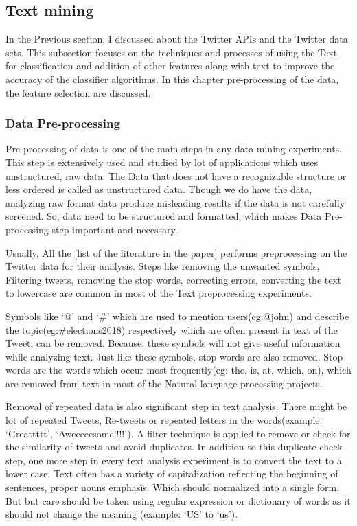  
\subsection{Text mining}

In the Previous section, I discussed about the Twitter APIs and the Twitter data sets. This subsection focuses on the techniques and processes of using the Text for classification and addition of other features along with text to improve the accuracy of the classifier algorithms.  In this chapter pre-processing of the data, the feature selection are discussed.

\subsubsection{Data Pre-processing}

Pre-processing of data is one of the main steps in any data mining experiments. This step is extensively used and studied by lot of applications which uses unstructured, raw data. The Data that does not have a recognizable structure or less ordered is called as unstructured data.  Though we do have the data, analyzing raw format data produce misleading results if the data is not carefully screened. So, data need to be structured and formatted, which makes Data Pre-processing step important and necessary.

Usually, All the \underline{[list of the literature in the paper]} performs preprocessing on the Twitter data for their analysis. Steps like removing the unwanted symbols, Filtering tweets, removing the stop words,  correcting errors, converting the text to lowercase are common in most of the Text preprocessing experiments.

Symbols like `@' and `\#' which are used to mention users(eg:@john) and describe the topic(eg:\#elections2018) respectively which are often present in text of the Tweet, can be removed. Because, these symbols will not give useful information while analyzing text. Just like these symbols, stop words are also removed. Stop words are the words which occur most frequently(eg: the, is, at, which, on), which are removed from text in most of the Natural language processing projects. 

Removal of repeated data is also significant step in text analysis. There might be lot of repeated Tweets, Re-tweets or repeated letters in the words(example: `Greattttt', `Aweeeeesome!!!!'). A filter technique is applied to remove or check for the similarity of tweets and avoid duplicates. In addition to this duplicate check step, one more step in every text analysis experiment is to convert the text to a lower case. Text often has a variety of capitalization reflecting the beginning of sentences, proper nouns emphasis. Which should normalized into a single form. But but care should be taken using regular expression or dictionary of words as it should not change the meaning (example: `US' to `us').

